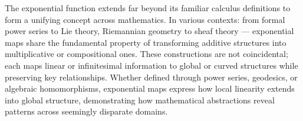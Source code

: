 The exponential function extends far beyond its familiar calculus definitions to form a unifying concept across mathematics. In various contexts: from formal power series to Lie theory, Riemannian geometry to sheaf theory — exponential maps share the fundamental property of transforming additive structures into multiplicative or compositional ones. These constructions are not coincidental; each maps linear or infinitesimal information to global or curved structures while preserving key relationships. Whether defined through power series, geodesics, or algebraic homomorphisms, exponential maps express how local linearity extends into global structure, demonstrating how mathematical abstractions reveal patterns across seemingly disparate domains.
